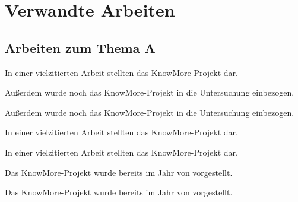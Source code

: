 \chapter{Verwandte Arbeiten}

\section{Arbeiten zum Thema A}

In einer vielzitierten Arbeit stellten \cite{Abecker/etal:00} das KnowMore-Projekt dar.

Außerdem wurde noch das KnowMore-Projekt \citep{Abecker/etal:00} in die Untersuchung einbezogen.

Außerdem wurde noch das KnowMore-Projekt \citep*{Abecker/etal:00} in die Untersuchung einbezogen.


In einer vielzitierten Arbeit stellten \citet{Abecker/etal:00} das KnowMore-Projekt dar.

In einer vielzitierten Arbeit stellten \citet*{Abecker/etal:00} das KnowMore-Projekt dar.

Das KnowMore-Projekt wurde bereits im Jahr \citeyear{Abecker/etal:00} von \citeauthor{Abecker/etal:00} vorgestellt.

Das KnowMore-Projekt wurde bereits im Jahr \citeyear{Abecker/etal:00} von \citeauthor*{Abecker/etal:00} vorgestellt.



